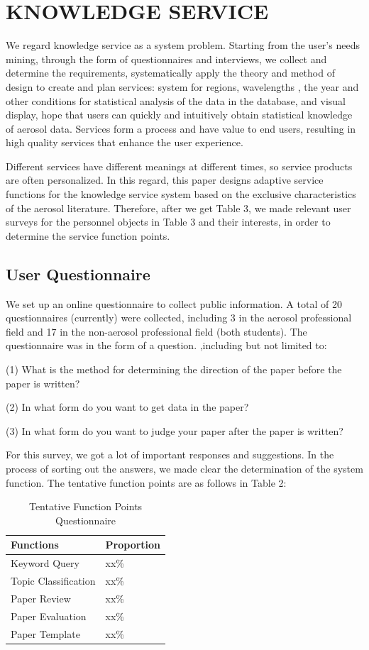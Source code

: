 \section{KNOWLEDGE SERVICE}
We regard knowledge service as a system problem. Starting from the user's needs mining, through the form of questionnaires and interviews, we collect and determine the requirements, systematically apply the theory and method of design to create and plan services: system for regions, wavelengths , the year and other conditions for statistical analysis of the data in the database, and visual display, hope that users can quickly and intuitively obtain statistical knowledge of aerosol data. Services form a process and have value to end users, resulting in high quality services that enhance the user experience.

Different services have different meanings at different times, so service products are often personalized. In this regard, this paper designs adaptive service functions for the knowledge service system based on the exclusive characteristics of the aerosol literature. Therefore, after we get Table 3, we made relevant user surveys for the personnel objects in Table 3 and their interests, in order to determine the service function points.

\subsection{User Questionnaire}
We set up an online questionnaire to collect public information. A total of 20 questionnaires (currently) were collected, including 3 in the aerosol professional field and 17 in the non-aerosol professional field (both students). The questionnaire was in the form of a question. ,including but not limited to:

(1) What is the method for determining the direction of the paper before the paper is written?

(2) In what form do you want to get data in the paper?

(3) In what form do you want to judge your paper after the paper is written?

For this survey, we got a lot of important responses and suggestions. In the process of sorting out the answers, we made clear the determination of the system function. The tentative function points are as follows in Table 2:

\begin{table}
	\caption{Tentative Function Points Questionnaire}
	\label{tab:freq}
	\begin{tabular}{ll}
		\toprule
		Functions&Proportion\\
		\midrule
		Keyword Query & xx\%\\
		Topic Classification & xx\%\\
		Paper Review & xx\%\\
		Paper Evaluation & xx\%\\
		Paper Template & xx\%\\
		\bottomrule
	\end{tabular}
\end{table}

